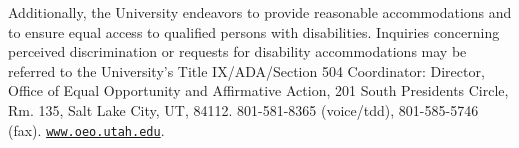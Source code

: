 \documentclass[11pt,]{article}
\begin{document}
Additionally, the University endeavors to provide reasonable
accommodations and to ensure equal access to qualified persons with
disabilities. Inquiries concerning perceived discrimination or requests
for disability accommodations may be referred to the University's Title
IX/ADA/Section 504 Coordinator: Director, Office of Equal Opportunity
and Affirmative Action, 201 South Presidents Circle, Rm. 135, Salt Lake
City, UT, 84112. 801-581-8365 (voice/tdd), 801-585-5746 (fax).
\href{www.oeo.utah.edu}{\texttt{www.oeo.utah.edu}}.
\end{document}
